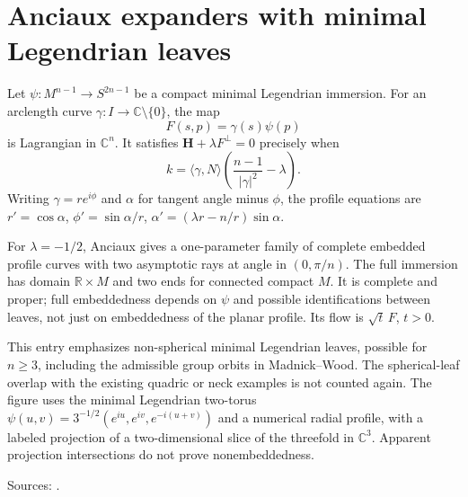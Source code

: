 \chapter{Anciaux expanders with minimal Legendrian leaves}\label{sec:catalogue-anciaux-legendrian-expanders}
\begin{example}\label{ex:catalogue-anciaux-legendrian-expanders}
Let $\psi:M^{n-1}\to S^{2n-1}$ be a compact minimal Legendrian immersion. For an arclength curve $\gamma:I\to\mathbb C\setminus\{0\}$, the map
\[
 F(s,p)=\gamma(s)\psi(p)
\]
is Lagrangian in $\mathbb C^n$. It satisfies $\mathbf H+\lambda F^\perp=0$ precisely when
\[
 k=\langle\gamma,N\rangle\left(\frac{n-1}{|\gamma|^2}-\lambda\right).
\]
Writing $\gamma=re^{i\phi}$ and $\alpha$ for tangent angle minus $\phi$, the profile equations are $r'=\cos\alpha$, $\phi'=\sin\alpha/r$, $\alpha'=(\lambda r-n/r)\sin\alpha$.

For $\lambda=-1/2$, Anciaux gives a one-parameter family of complete embedded profile curves with two asymptotic rays at angle in $(0,\pi/n)$. The full immersion has domain $\mathbb R\times M$ and two ends for connected compact $M$. It is complete and proper; full embeddedness depends on $\psi$ and possible identifications between leaves, not just on embeddedness of the planar profile. Its flow is $\sqrt t\,F$, $t>0$.

This entry emphasizes non-spherical minimal Legendrian leaves, possible for $n\ge3$, including the admissible group orbits in Madnick--Wood. The spherical-leaf overlap with the existing quadric or neck examples is not counted again. The figure uses the minimal Legendrian two-torus $\psi(u,v)=3^{-1/2}(e^{iu},e^{iv},e^{-i(u+v)})$ and a numerical radial profile, with a labeled projection of a two-dimensional slice of the threefold in $\mathbb C^3$. Apparent projection intersections do not prove nonembeddedness.
\par Sources: \cite{CatAnciaux2006,CatMadnickWood2025}.
\end{example}

